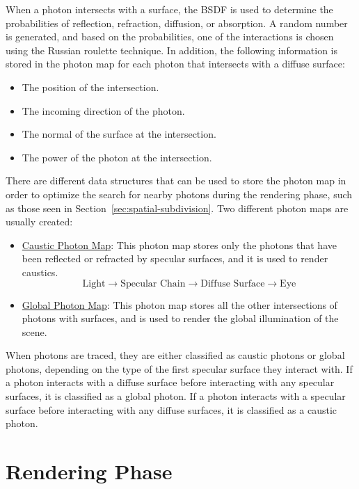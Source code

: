 When a photon intersects with a surface, the BSDF is used to determine the probabilities of reflection, refraction, diffusion, or absorption. A random number is generated, and based on the probabilities, one of the interactions is chosen using the Russian roulette technique.
In addition, the following information is stored in the photon map for each photon that intersects with a diffuse surface:
\begin{itemize}
    \item The position of the intersection.
    \item The incoming direction of the photon.
    \item The normal of the surface at the intersection.
    \item The power of the photon at the intersection.
\end{itemize}

There are different data structures that can be used to store the photon map in order to optimize the search for nearby photons during the rendering phase, such as those seen in Section~\ref{sec:spatial-subdivision}. Two different photon maps are usually created:
\begin{itemize}
    \item \ul{Caustic Photon Map}: This photon map stores only the photons that have been reflected or refracted by specular surfaces, and it is used to render caustics.
    \begin{equation*}
        \text{Light} \rightarrow \text{Specular Chain} \rightarrow \text{Diffuse Surface} \rightarrow \text{Eye}
    \end{equation*}

    \item \ul{Global Photon Map}: This photon map stores all the other intersections of photons with surfaces, and is used to render the global illumination of the scene.
\end{itemize}

When photons are traced, they are either classified as caustic photons or global photons, depending on the type of the first specular surface they interact with. If a photon interacts with a diffuse surface before interacting with any specular surfaces, it is classified as a global photon. If a photon interacts with a specular surface before interacting with any diffuse surfaces, it is classified as a caustic photon.

\section{Rendering Phase}

